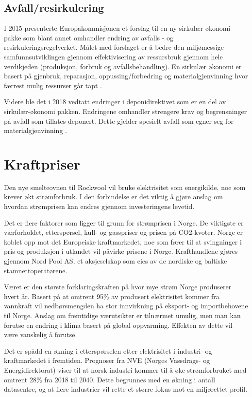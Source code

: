 \subsection{Avfall/resirkulering}
I 2015 presenterte Europakommisjonen et forslag til en ny sirkulær-økonomi pakke som blant annet omhandler endring av avfalls - og resirkuleringsregelverket. Målet med forslaget er å bedre den miljømessige samfunnsutviklingen gjennom effektivisering av ressursbruk gjennom hele verdikjeden (produksjon, forbruk og avfallsbehandling). En sirkulær økonomi er basert på gjenbruk, reparasjon, oppussing/forbedring og materialgjenvinning hvor færrest mulig ressurser går tapt \cite{sirkularokonomi}.

\indent \newline
Videre ble det i 2018 vedtatt endringer i deponidirektivet som er en del av sirkulær-økonomi pakken. Endringene omhandler strengere krav og begrensninger på avfall som tillates deponert. Dette gjelder spesielt avfall som egner seg for materialgjenvinning \cite{materialgjenvinning}.

\section{Kraftpriser}
Den nye smelteovnen til Rockwool vil bruke elektrisitet som energikilde, noe som krever økt strømforbruk. I den forbindelse er det viktig å gjøre anslag om hvordan strømprisen kan endres gjennom investeringens levetid.

\indent \newline
Det er flere faktorer som ligger til grunn for strømprisen i Norge. De viktigste er værforholdet, etterspørsel, kull- og gasspriser og prisen på CO2-kvoter. Norge er koblet opp mot det Europeiske kraftmarkedet, noe som fører til at svingninger i pris og produksjon i utlandet vil påvirke prisene i Norge. Krafthandlene gjøres gjennom Nord Pool AS, et aksjeselskap som eies av de nordiske og baltiske stamnettoperatørene.

\indent \newline
Været er den største forklaringskraften på hvor mye strøm Norge produserer hvert år. Basert på at omtrent 95\% av produsert elektrisitet kommer fra vannkraft vil nedbørsmengden ha stor innvirkning på eksport- og importbehovene til Norge. Anslag om fremtidige værutsikter er tilnærmet umulig, men man kan forutse en endring i klima basert på global oppvarming. Effekten av dette vil være vanskelig å forutse.

\indent \newline
Det er spådd en økning i etterspørselen etter elektrisitet i industri- og kraftmarkedet i fremtiden. Prognoser fra NVE (Norges Vassdrags- og Energidirektorat) viser til at norsk
industri kommer til å øke strømforbruket med omtrent 28\% fra 2018 til 2040. Dette
begrunnes med en økning i antall datasentre, og at flere industrier vil rette et større fokus mot en miljørettet profil.

